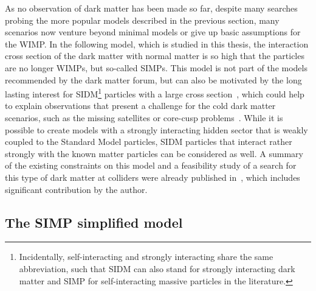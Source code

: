 As no observation of dark matter has been made so far, despite many searches probing the more popular models described in the previous section, many scenarios now venture beyond minimal models or give up basic assumptions for the \ac{WIMP}. In the following model, which is studied in this thesis, the interaction cross section of the dark matter with normal matter is so high that the particles are no longer \acp{WIMP}, but so-called \acp{SIMP}. This model is not part of the models recommended by the dark matter forum, but can also be motivated by the long lasting interest for \ac{SIDM}\footnote{Incidentally, self-interacting and strongly interacting share the same abbreviation, such that SIDM can also stand for strongly interacting dark matter and SIMP for self-interacting massive particles in the literature.} particles with a large cross section~\cite{Spergel:1999mh}, which could help to explain observations that present a challenge for the cold dark matter scenarios, such as the missing satellites or core-cusp problems~\cite{Bullock:2010uy,BoylanKolchin:2011de, Weinberg:2013aya,Famaey:2013ty}. While it is possible to create models with a strongly interacting hidden sector that is weakly coupled to the Standard Model particles, \ac{SIDM} particles that interact rather strongly with the known matter particles can be considered as well. A summary of the existing constraints on this model and a feasibility study of a search for this type of dark matter at colliders were already published in~\cite{Daci:2015hca}, which includes significant contribution by the author.

\subsection{The SIMP simplified model}
\label{sec:SIMP_model}

